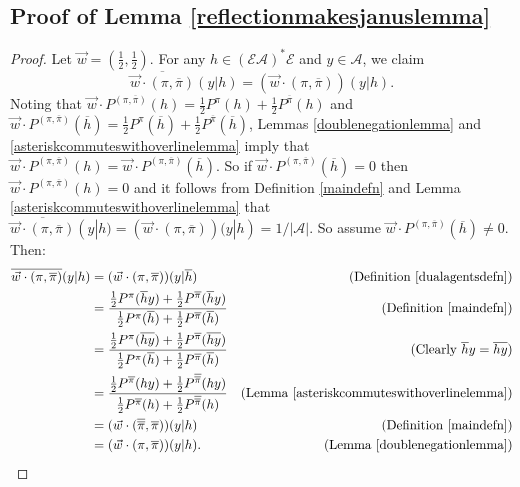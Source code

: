 \documentclass[twoside]{article}
\begin{document}
\subsection{Proof of Lemma \ref{reflectionmakesjanuslemma}}
\begin{proof}
    Let $\vec w=(\frac12,\frac12)$.
    For any $h\in(\mathcal E\mathcal A)^*\mathcal E$ and $y\in\mathcal A$,
    we claim
    \[
        \overline{\vec w\cdot(\pi,\overline{\pi})}(y|h)
        =(\vec w\cdot(\pi,\overline{\pi}))(y|h).
    \]
    Noting that
    $\vec w\cdot P^{(\pi,\overline{\pi})}(h)
    =\frac12P^\pi(h)+\frac12P^{\overline\pi}(h)$
    and
    $\vec w\cdot P^{(\pi,\overline{\pi})}(\overline h)
    =\frac12P^\pi(\overline h)+\frac12P^{\overline\pi}(\overline h)$,
    Lemmas \ref{doublenegationlemma} and \ref{asteriskcommuteswithoverlinelemma}
    imply that
    $\vec w\cdot P^{(\pi,\overline{\pi})}(h)
    =\vec w\cdot P^{(\pi,\overline{\pi})}(\overline h)$.
    So if
    $\vec w\cdot P^{(\pi,\overline{\pi})}(\overline h)=0$
    then $\vec w\cdot P^{(\pi,\overline{\pi})}(h)=0$
    and it follows from
    Definition \ref{maindefn}
    and Lemma \ref{asteriskcommuteswithoverlinelemma} that
    $\overline{\vec w\cdot(\pi,\overline{\pi})}(y|h)
    =(\vec w\cdot(\pi,\overline{\pi}))(y|h)=1/|\mathcal A|$.
    So assume $\vec w\cdot P^{(\pi,\overline{\pi})}(\overline h)\not=0$.
    Then:
    \begin{align*}
        \overline{\vec w\cdot(\pi,\overline{\pi})}(y|h)
        &= (\vec w\cdot(\pi,\overline{\pi}))(y|\overline h)
            &\mbox{(Definition \ref{dualagentsdefn})}\\
        &= \frac
            {\frac12P^\pi(\overline hy)+\frac12P^{\overline\pi}(\overline hy)}
            {\frac12P^\pi(\overline h)+\frac12P^{\overline\pi}(\overline h)}
            &\mbox{(Definition \ref{maindefn})}\\
        &= \frac
            {\frac12P^\pi(\overline{hy})+\frac12P^{\overline\pi}(\overline{hy})}
            {\frac12P^\pi(\overline h)+\frac12P^{\overline\pi}(\overline h)}
            &\mbox{(Clearly $\overline hy=\overline{hy}$)}\\
        &= \frac
            {\frac12P^{\overline\pi}(hy)+\frac12P^{\overline{\overline\pi}}(hy)}
            {\frac12P^{\overline\pi}(h)+\frac12P^{\overline{\overline\pi}}(h)}
            &\mbox{(Lemma \ref{asteriskcommuteswithoverlinelemma})}\\
        &= (\vec w\cdot(\overline{\overline\pi},\overline\pi))(y|h)
            &\mbox{(Definition \ref{maindefn})}\\
        &= (\vec w\cdot(\pi,\overline\pi))(y|h).
            &\mbox{(Lemma \ref{doublenegationlemma})}
    \end{align*}
\end{proof}
\end{document}
